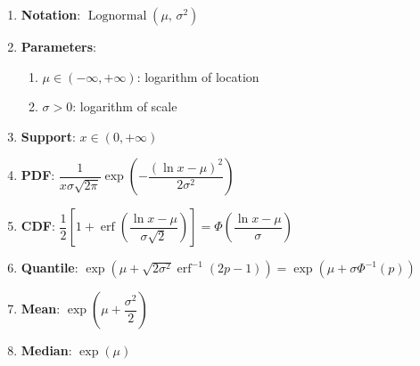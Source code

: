 \begin{enumerate}
    \item \textbf{Notation}:
    ${\displaystyle \operatorname {Lognormal} \left(\mu ,\,\sigma ^{2}\right)}$
    \hfill \cite{wiki/Log-normal_distribution}

    \item \textbf{Parameters}:
    \begin{enumerate}
        \item ${\displaystyle \mu \in (-\infty ,+\infty )}$: logarithm of location
        \hfill \cite{wiki/Log-normal_distribution, statistics/book/Statistics-for-Data-Scientists/Maurits-Kaptein}

        \item ${\displaystyle \sigma >0}$: logarithm of scale
        \hfill \cite{wiki/Log-normal_distribution, statistics/book/Statistics-for-Data-Scientists/Maurits-Kaptein}
    \end{enumerate}

    \item \textbf{Support}: ${\displaystyle x\in (0,+\infty )}$
    \hfill \cite{wiki/Log-normal_distribution, statistics/book/Statistics-for-Data-Scientists/Maurits-Kaptein}

    \item \textbf{PDF}:
    ${\displaystyle {\dfrac {1}{x\sigma {\sqrt {2\pi }}}}\exp \left(-{\dfrac {\left(\ln x-\mu \right)^{2}}{2\sigma ^{2}}}\right)}$
    \hfill \cite{wiki/Log-normal_distribution, statistics/book/Statistics-for-Data-Scientists/Maurits-Kaptein}

    \item \textbf{CDF}:
    $
        {\displaystyle {{\dfrac {1}{2}}\left[1+\operatorname {erf} \left({\dfrac {\ln x-\mu }{\sigma {\sqrt {2}}}}\right)\right]
        =\Phi {\left({\dfrac {\ln x-\mu }{\sigma }}\right)}}}
    $
    \hfill \cite{wiki/Log-normal_distribution}

    \item \textbf{Quantile}:
    $
        {\displaystyle {\exp \left(\mu +{\sqrt {2\sigma ^{2}}}\operatorname {erf} ^{-1}(2p-1)\right)
        =\exp(\mu +\sigma \Phi ^{-1}(p))}}
    $
    \hfill \cite{wiki/Log-normal_distribution}

    \item \textbf{Mean}: ${\displaystyle \exp \left(\mu +{\dfrac {\sigma ^{2}}{2}}\right)}$
    \hfill \cite{wiki/Log-normal_distribution}

    \item \textbf{Median}: ${\displaystyle \exp(\mu )}$
    \hfill \cite{wiki/Log-normal_distribution}


\end{enumerate}

